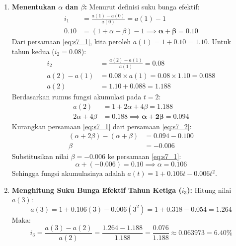 \documentclass[11pt,a4paper]{article}
\begin{document}
\begin{solutionbox}[Soal 7]
\begin{enumerate}[label=(\alph*)]
    \item \textbf{Menentukan $\alpha$ dan $\beta$:}
    Menurut definisi suku bunga efektif:
    \begin{align*}
        i_1 &= \frac{a(1) - a(0)}{a(0)} = a(1) - 1 \\
        0.10 &= (1 + \alpha + \beta) - 1 \implies \mathbf{\alpha + \beta = 0.10} \label{eq:s7_1} \tag{1}
    \end{align*}
    Dari persamaan \eqref{eq:s7_1}, kita peroleh $a(1) = 1 + 0.10 = 1.10$.
    Untuk tahun kedua ($i_2 = 0.08$):
    \begin{align*}
        i_2 &= \frac{a(2) - a(1)}{a(1)} = 0.08 \\
        a(2) - a(1) &= 0.08 \times a(1) = 0.08 \times 1.10 = 0.088 \\
        a(2) &= 1.10 + 0.088 = 1.188
    \end{align*}
    Berdasarkan rumus fungsi akumulasi pada $t = 2$:
    \begin{align*}
        a(2) &= 1 + 2\alpha + 4\beta = 1.188 \\
        2\alpha + 4\beta &= 0.188 \implies \mathbf{\alpha + 2\beta = 0.094} \label{eq:s7_2} \tag{2}
    \end{align*}
    Kurangkan persamaan \eqref{eq:s7_1} dari persamaan \eqref{eq:s7_2}:
    \begin{align*}
        (\alpha + 2\beta) - (\alpha + \beta) &= 0.094 - 0.100 \\
        \beta &= \mathbf{-0.006}
    \end{align*}
    Substitusikan nilai $\beta = -0.006$ ke persamaan \eqref{eq:s7_1}:
    \begin{equation*}
        \alpha + (-0.006) = 0.10 \implies \alpha = \mathbf{0.106}
    \end{equation*}
    Sehingga fungsi akumulasinya adalah $a(t) = 1 + 0.106t - 0.006t^2$.

    \item \textbf{Menghitung Suku Bunga Efektif Tahun Ketiga ($i_3$):}
    Hitung nilai $a(3)$:
    \begin{equation*}
        a(3) = 1 + 0.106(3) - 0.006(3^2) = 1 + 0.318 - 0.054 = 1.264
    \end{equation*}
    Maka:
    \begin{equation*}
        i_3 = \frac{a(3) - a(2)}{a(2)} = \frac{1.264 - 1.188}{1.188} = \frac{0.076}{1.188} \approx 0.063973 = \mathbf{6.40\%}
    \end{equation*}


\end{enumerate}
\end{solutionbox}
\end{document}
